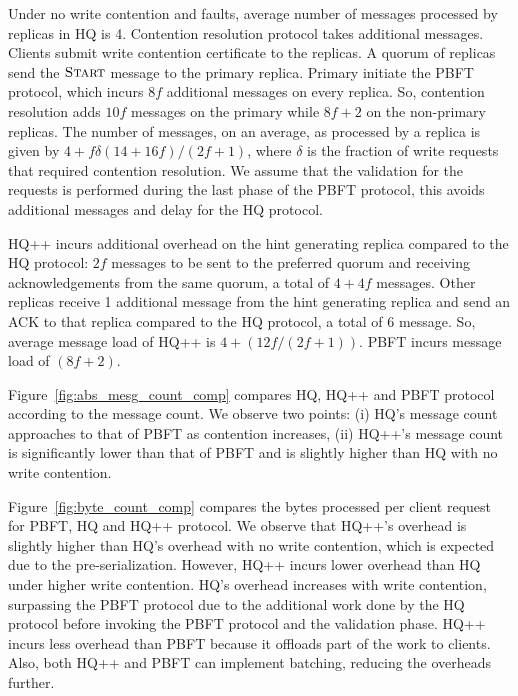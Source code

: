 \documentclass[twocolumn,10pt]{article}
\begin{document}
 Under no write contention and faults, average number of messages processed
by replicas in HQ is 4. Contention resolution protocol takes additional messages. Clients submit 
write contention certificate to the replicas. A quorum of replicas send the $\msg{Start}$ message
to the primary replica. Primary initiate the PBFT protocol, which incurs $8f$ additional messages 
on every replica. So, contention resolution adds $10f$ messages on the primary while $8f+2$ on the
non-primary replicas. The number of messages, on an average, as processed by a replica 
is given by $4+f\delta(14+16f)/(2f+1)$, where $\delta$ is the fraction of write requests that
required contention resolution. We assume that the validation for the requests is performed during
the last phase of the PBFT protocol, this avoids additional messages and delay for the HQ protocol.

HQ++ incurs additional overhead on the hint generating replica compared to the HQ protocol: $2f$ messages
to be sent to the preferred quorum and receiving acknowledgements from the same quorum, a total
of $4+4f$ messages. Other replicas
receive 1 additional message from the hint generating replica and send an ACK to that replica compared 
to the HQ protocol, a total
of 6 message.
So, average message load of HQ++ is $4+(12f/(2f+1))$. PBFT incurs message
load of $(8f+2)$. 

Figure~\ref{fig:abs_mesg_count_comp} compares HQ, HQ++ and PBFT protocol according to the message
count. We observe two points: (i) HQ's message count approaches to that of PBFT as contention
increases, (ii) HQ++'s message count is significantly lower than that of PBFT and is slightly
higher than HQ with no write contention.



Figure~\ref{fig:byte_count_comp} compares the
bytes processed per client request for PBFT, HQ and HQ++ protocol. We observe that
HQ++'s overhead is slightly higher than HQ's overhead with no write contention, which is expected due
to the pre-serialization. However, HQ++ incurs lower overhead than HQ under higher write contention.
HQ's overhead increases with write contention, surpassing the PBFT
protocol due to the additional work done by the HQ protocol before invoking the PBFT protocol and
the validation phase. HQ++ incurs less overhead than PBFT because it offloads part of the work to
clients. Also, both HQ++ and PBFT can implement batching, reducing the overheads further.
\end{document}
